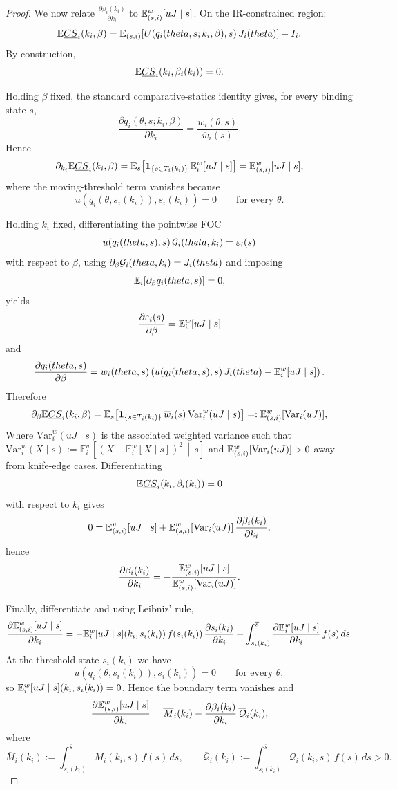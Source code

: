 \documentclass[master.tex]{subfiles}
\begin{document}
\begin{proof}
We now relate $\frac{\partial \beta_i(k_i)}{\partial k_i}$ to $\mathbb{E}_{(s,i)}^w[uJ\mid s]$. On the IR-constrained region:
\[
\mathbb{E} \underline{CS}_i(k_i,\beta)
=
\mathbb{E}_{(s,i)}\!\left[ U\!\left(q_i(theta,s;k_i,\beta),s\right)J_i(theta)
\right]
-I_i.
\]
By construction,
\[
\mathbb{E} \underline{CS}_i\!\left(k_i,\beta_i(k_i)\right)=0.
\]

Holding $\beta$ fixed, the standard comparative-statics identity gives, for every binding state $s$,
\[
\frac{\partial q_i(\theta,s;k_i,\beta)}{\partial k_i}
=
\frac{w_i(\theta,s)}{\overline w_i(s)}.
\]
Hence
\[
\partial_{k_i}\mathbb{E} \underline{CS}_i(k_i,\beta)
=
\mathbb{E}_s\!\left[
\mathbf 1_{\{s\in T_i(k_i)\}}
\,
\mathbb{E}_i^w[uJ\mid s]
\right]
=
\mathbb{E}_{(s,i)}^w[uJ\mid s],
\]
where the moving-threshold term vanishes because
\[
u\!\left(q_i(\theta,s_i(k_i)),s_i(k_i)\right)=0
\qquad
\text{for every }\theta.
\]

Holding $k_i$ fixed, differentiating the pointwise FOC
\[
u\!\left(q_i(theta,s),s\right)\mathcal{G}_i(theta,k_i)
=
\varepsilon_i(s)
\]
with respect to $\beta$, using $\partial_\beta\mathcal{G}_i(theta,k_i)=J_i(theta)$ and imposing
\[
\mathbb{E}_i\!\left[\partial_\beta q_i(theta,s)\right]=0,
\]
yields
\[
\frac{\partial \varepsilon_i(s)}{\partial \beta}
=
\mathbb{E}_i^w[uJ\mid s]
\]
and
\[
\frac{\partial q_i(theta,s)}{\partial \beta}
=
w_i(theta,s)
\left(
u\!\left(q_i(theta,s),s\right)J_i(theta)
-
\mathsf {\mathbb{E}}_i^w[uJ\mid s]
\right).
\]
Therefore
\[
\partial_\beta \mathbb{E} \underline{CS}_i(k_i,\beta)
=
\mathbb{E}_s\!\left[
\mathbf 1_{\{s\in T_i(k_i)\}}
\,
\overline w_i(s)\,
\mathrm{Var}_i^w(uJ\mid s)
\right]
=:
\mathbb{E}_{(s,i)}^w[\mathrm{Var}_i(uJ)],
\]
Where $\mathrm{Var}_i^w(uJ\mid s)$ is the associated weighted variance such that $\mathrm{Var}_i^w(X\mid s)
:=
\mathbb E_i^w\!\left[
\left(X-\mathbb E_i^w[X\mid s]\right)^2
\,\middle|\, s
\right]$ and $\mathbb{E}_{(s,i)}^w[\mathrm{Var}_i(uJ)]>0$ away from knife-edge cases. Differentiating
\[
\mathbb{E} \underline{CS}_i\!\left(k_i,\beta_i(k_i)\right)=0
\]
with respect to $k_i$ gives
\[
0
=
\mathbb{E}_{(s,i)}^w[uJ\mid s]+\mathbb{E}_{(s,i)}^w[\mathrm{Var}_i(uJ)]\,\frac{\partial \beta_i(k_i)}{\partial k_i},
\]
hence
\[
\frac{\partial \beta_i(k_i)}{\partial k_i}
=
-\frac{\mathbb{E}_{(s,i)}^w[uJ\mid s]}{\mathbb{E}_{(s,i)}^w[\mathrm{Var}_i(uJ)]}.
\]

Finally, differentiate and using Leibniz' rule,
\[
\frac{\partial \mathbb{E}_{(s,i)}^w[uJ\mid s]}{\partial k_i}
=
-
\mathbb{E}_i^w[uJ\mid s]\!\left(k_i,s_i(k_i)\right)
f\!\left(s_i(k_i)\right)
\frac{\partial s_i(k_i)}{\partial k_i}
+
\int_{s_i(k_i)}^{\overline s}
\frac{\partial \mathbb{E}_i^w[uJ\mid s]}{\partial k_i}\,f(s)\,ds.
\]
At the threshold state $s_i(k_i)$ we have
\[
u\!\left(q_i(\theta,s_i(k_i)),s_i(k_i)\right)=0
\qquad
\text{for every }\theta,
\]
so $\mathbb{E}_i^w[uJ\mid s]\!\left(k_i,s_i(k_i)\right)=0$. Hence the boundary term vanishes and
\[
\frac{\partial \mathbb{E}_{(s,i)}^w[uJ\mid s]}{\partial k_i}
=
\overline M_i(k_i)-\frac{\partial \beta_i(k_i)}{\partial k_i}\,\overline{\mathcal Q}_i(k_i),
\]
where
\[
\overline M_i(k_i)
:=
\int_{s_i(k_i)}^{\overline s}M_i(k_i,s)\,f(s)\,ds,
\qquad
\overline{\mathcal Q}_i(k_i)
:=
\int_{s_i(k_i)}^{\overline s}\mathcal Q_i(k_i,s)\,f(s)\,ds
>0.
\]


\end{proof}
\end{document}
